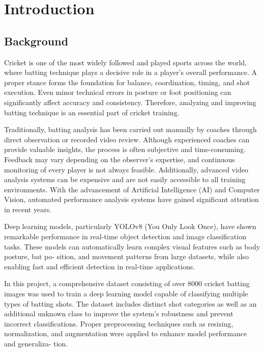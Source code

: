 \chapter{Introduction}
\label{C1} %
\graphicspath{{Figures/Chapter-1figs/PDF/}{Figures/Chapter-1figs/}}
\onehalfspacing
\section{Background} \label{S1.1}
Cricket is one of the most widely followed and played sports
across the world, where batting technique plays a decisive
role in a player’s overall performance. A proper stance forms
the foundation for balance, coordination, timing, and shot
execution. Even minor technical errors in posture or foot
positioning can significantly affect accuracy and consistency.
Therefore, analyzing and improving batting technique is an
essential part of cricket training. 

Traditionally, batting analysis
has been carried out manually by coaches through direct
observation or recorded video review. Although experienced
coaches can provide valuable insights, the process is often
subjective and time-consuming. Feedback may vary depending
on the observer’s expertise, and continuous monitoring of
every player is not always feasible. Additionally, advanced
video analysis systems can be expensive and are not easily
accessible to all training environments.
With the advancement of Artificial Intelligence (AI) and
Computer Vision, automated performance analysis systems
have gained significant attention in recent years. 

Deep learning
models, particularly YOLOv8 (You Only Look Once), have
shown remarkable performance in real-time object detection
and image classification tasks. These models can automatically
learn complex visual features such as body posture, bat po-
sition, and movement patterns from large datasets, while also
enabling fast and efficient detection in real-time applications.

In this project, a comprehensive dataset consisting of over
8000 cricket batting images was used to train a deep learning
model capable of classifying multiple types of batting shots.
The dataset includes distinct shot categories as well as an
additional unknown class to improve the system’s robustness
and prevent incorrect classifications. Proper preprocessing
techniques such as resizing, normalization, and augmentation
were applied to enhance model performance and generaliza-
tion.

